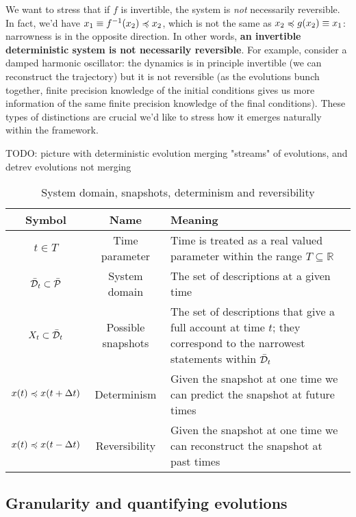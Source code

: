 \documentclass[letterpaper]{article}
\begin{document}
We want to stress that if $f$ is invertible, the system is \emph{not} necessarily reversible. In fact, we'd have $x_1 \equiv f^{-1}(x_2) \narrower x_2$, which is not the same as $x_2 \narrower g(x_2) \equiv x_1$: narrowness is in the opposite direction. In other words, \textbf{an invertible deterministic system is not necessarily reversible}. For example, consider a damped harmonic oscillator: the dynamics is in principle invertible (we can reconstruct the trajectory) but it is not reversible (as the evolutions bunch together, finite precision knowledge of the initial conditions gives us more information of the same finite precision knowledge of the final conditions). These types of distinctions are crucial we'd like to stress how it emerges naturally within the framework.

TODO: picture with deterministic evolution merging "streams" of evolutions, and detrev evolutions not merging

\begin{table}[h!]
	\centering
	\begin{tabular}[h]{|c|c|p{6cm}|}
		\hline 
		Symbol & Name & Meaning \\ 
		\hline 
		$t \in T$ & Time parameter & Time is treated as a real valued parameter within the range $T \subseteq \mathbb{R}$ \\ 
		\hline 
		$\tdomain_t \subset \tdomain[P]$ & System domain & The set of descriptions at a given time \\ 
		\hline 
		$X_t \subset \tdomain_t$ & Possible snapshots & The set of descriptions that give a full account at time $t$; they correspond to the narrowest statements within $\tdomain_t$ \\ 
		\hline 
		$x(t) \narrower x(t + \Delta t)$ & Determinism & Given the snapshot at one time we can predict the snapshot at future times \\ 
		\hline 
		$x(t) \narrower x(t - \Delta t)$ & Reversibility & Given the snapshot at one time we can reconstruct the snapshot at past times \\ 
		\hline 
	\end{tabular} 
	\caption{System domain, snapshots, determinism and reversibility}
	\label{table:states}
\end{table}

\subsection{Granularity and quantifying evolutions}
\end{document}
